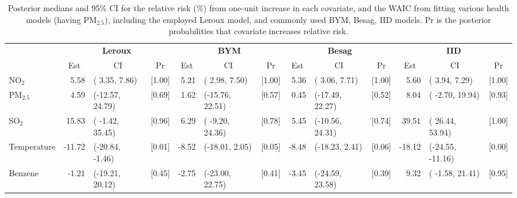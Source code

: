 \documentclass[12,]{article}
\begin{document}
\begin{landscape}\begin{table}

\caption{\label{tab:monitoringModel}Posterior medians and 95\% CI for the relative risk (\%) from one-unit increase in each covariate, and the WAIC from fitting various health models (having PM$_{2.5}$), including the employed Leroux model, and commonly used BYM, Besag, IID models. Pr is the posterior probabilities that covariate increases relative risk.}
\centering
\fontsize{9}{11}\selectfont
\begin{tabular}[t]{lrlcrlcrlcrlc}
\toprule
\multicolumn{1}{c}{\textbf{ }} & \multicolumn{3}{c}{\textbf{Leroux}} & \multicolumn{3}{c}{\textbf{BYM}} & \multicolumn{3}{c}{\textbf{Besag}} & \multicolumn{3}{c}{\textbf{IID}} \\
\cmidrule(l{3pt}r{3pt}){2-4} \cmidrule(l{3pt}r{3pt}){5-7} \cmidrule(l{3pt}r{3pt}){8-10} \cmidrule(l{3pt}r{3pt}){11-13}
\multicolumn{1}{c}{ } & \multicolumn{1}{c}{Est} & \multicolumn{1}{c}{CI} & \multicolumn{1}{c}{Pr} & \multicolumn{1}{c}{Est} & \multicolumn{1}{c}{CI} & \multicolumn{1}{c}{Pr} & \multicolumn{1}{c}{Est} & \multicolumn{1}{c}{CI} & \multicolumn{1}{c}{Pr} & \multicolumn{1}{c}{Est} & \multicolumn{1}{c}{CI} & \multicolumn{1}{c}{Pr} \\
\cmidrule(l{3pt}r{3pt}){2-2} \cmidrule(l{3pt}r{3pt}){3-3} \cmidrule(l{3pt}r{3pt}){4-4} \cmidrule(l{3pt}r{3pt}){5-5} \cmidrule(l{3pt}r{3pt}){6-6} \cmidrule(l{3pt}r{3pt}){7-7} \cmidrule(l{3pt}r{3pt}){8-8} \cmidrule(l{3pt}r{3pt}){9-9} \cmidrule(l{3pt}r{3pt}){10-10} \cmidrule(l{3pt}r{3pt}){11-11} \cmidrule(l{3pt}r{3pt}){12-12} \cmidrule(l{3pt}r{3pt}){13-13}
NO$_2$ & 5.58 & (  3.35,   7.86) & [1.00] & 5.21 & (  2.98,   7.50) & [1.00] & 5.36 & (  3.06,   7.71) & [1.00] & 5.60 & (  3.94,   7.29) & [1.00]\\
PM$_{2.5}$ & 4.59 & (-12.57,  24.79) & [0.69] & 1.62 & (-15.76,  22.51) & [0.57] & 0.45 & (-17.49,  22.27) & [0.52] & 8.04 & ( -2.70,  19.94) & [0.93]\\
SO$_2$ & 15.83 & ( -1.42,  35.45) & [0.96] & 6.29 & ( -9.20,  24.36) & [0.78] & 5.45 & (-10.56,  24.31) & [0.74] & 39.51 & ( 26.44,  53.94) & [1.00]\\
Temperature & -11.72 & (-20.84,  -1.46) & [0.01] & -8.52 & (-18.01,   2.05) & [0.05] & -8.48 & (-18.23,   2.41) & [0.06] & -18.12 & (-24.55, -11.16) & [0.00]\\
Benzene & -1.21 & (-19.21,  20.12) & [0.45] & -2.75 & (-23.00,  22.75) & [0.41] & -3.45 & (-24.59,  23.58) & [0.39] & 9.32 & ( -1.58,  21.41) & [0.95]\\

\end{tabular}
\end{table}
\end{landscape}
\end{document}
